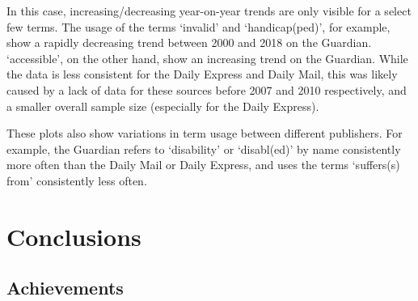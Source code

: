 \documentclass{report}
\begin{document}
In this case, increasing/decreasing year-on-year trends are only visible for a select few terms.
The usage of the terms `invalid' and `handicap(ped)', for example, show a rapidly decreasing trend between 2000 and 2018 on the Guardian.
`accessible', on the other hand, show an increasing trend on the Guardian.
While the data is less consistent for the Daily Express and Daily Mail, this was likely caused by a lack of data for these sources before 2007 and 2010 respectively, and a smaller overall sample size (especially for the Daily Express).

These plots also show variations in term usage between different publishers.
For example, the Guardian refers to `disability' or `disabl(ed)' by name consistently more often than the Daily Mail or Daily Express, and uses the terms `suffers(s) from' consistently less often.






\chapter{Conclusions} \label{Conclusions}  %


\section{Achievements} \label{Achievements}
\end{document}
